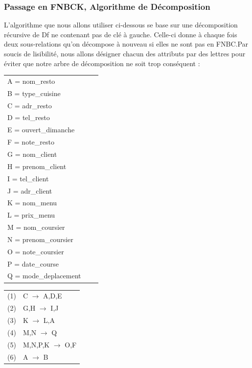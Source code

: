 \documentclass[french]{article}
\begin{document}
        \subsubsection *{Passage en FNBCK, Algorithme de Décomposition}
            L'algorithme que nous allons utiliser ci-dessous se base sur une décomposition récursive de Df ne contenant pas de clé à gauche. Celle-ci donne à chaque fois deux sous-relations qu'on décompose à nouveau si elles ne sont pas en FNBC.\newline Par soucis de lisibilité, nous allons désigner chacun des attributs par des lettres pour éviter que notre arbre de décomposition ne soit trop conséquent :
            \bigskip
            
 
            \begin{tabular}{lll}
                A = nom\_resto \\
                B = type\_cuisine \\
                C = adr\_resto \\
                D = tel\_resto \\
                E = ouvert\_dimanche \\
                F = note\_resto \\
                G = nom\_client \\
                H = prenom\_client \\
                I = tel\_client \\
                J = adr\_client \\
                K = nom\_menu \\
                L = prix\_menu \\
                M = nom\_coursier \\
                N = prenom\_coursier \\
                O = note\_coursier \\
                P = date\_course \\
                Q = mode\_deplacement \\
            \end{tabular}
            \hfill
            \begin{tabular}{ll}
                (1) & C $\rightarrow$ A,D,E \\
                (2) & G,H $\rightarrow$ I,J \\
                (3) & K $\rightarrow$ L,A \\
                (4) & M,N $\rightarrow$ Q \\
                (5) & M,N,P,K $\rightarrow$ O,F \\
                (6) & A $\rightarrow$ B \\
            \end{tabular}
            \bigskip
            
\end{document}
